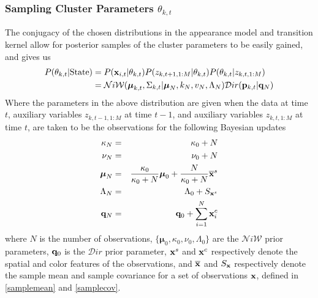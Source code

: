 \documentclass[twocolumn, final]{svjour3}
\begin{document}
\subsubsection{Sampling Cluster Parameters $\theta_{k, t}$}
The conjugacy of the chosen distributions in the appearance model and transition kernel allow for posterior samples of the cluster parameters to be easily gained, and gives us
\begin{align}
\begin{split}
P(\theta_{k,t} | \text{State}) & = P(\bold{x}_{i,t} | \theta_{k,t}) P(z_{k,t+1,1:M} | \theta_{k,t})  P(\theta_{k,t} | z_{k,t,1:M}) \\
 & = \mathcal{N}i\mathcal{W}(\boldsymbol{\mu}_{k,t}, \Sigma_{k,t} | \boldsymbol{\mu}_{N}, k_{N}, v_{N}, \Lambda_{N})  \mathcal{D}ir( \bold{p}_{k,t} | \bold{q}_{N})
\end{split}
\end{align}
Where the parameters in the above distribution are given when the data at time $t$, auxiliary variables $z_{k,t-1,1:M}$ at time $t-1$, and auxiliary variables $z_{k,t,1:M}$ at time $t$, are taken to be the observations for the following Bayesian updates
\begin{eqnarray}
\label{bayesian_update_1}
\kappa_{N} &=& \kappa_{0} + N \\
\label{bayesian_update_2}
\nu_{N} &=& \nu_{0} + N \\
\label{bayesian_update_3}
\boldsymbol{\mu}_{N} &=& \frac{\kappa_{0}}{\kappa_{0}+N} \boldsymbol{\mu}_{0}  +  \frac{N}{\kappa_{0}+N} \overline{\bold{x}}^{s}\\
\Lambda_{N} &=& \Lambda_{0} + S_{\bold{x}^{s}}\\
\label{bayesian_update_4}
\bold{q}_{N} &=& \bold{q}_{0} + \sum_{i=1}^{N} \bold{x}_{i}^{c}
\end{eqnarray}
where $N$ is the number of observations, $\{ \boldsymbol{\mu}_{0}, \kappa_{0}, \nu_{0}, \Lambda_{0} \}$ are the $\mathcal{N}i\mathcal{W}$ prior parameters, $\bold{q}_{0}$ is the $\mathcal{D}ir$ prior parameter, $\bold{x}^{s}$ and $\bold{x}^{c}$ respectively denote the spatial and color features of the observations, and $\overline{\bold{x}}$ and $S_{\bold{x}}$ respectively denote the sample mean and sample covariance for a set of observations $\bold{x}$, defined in \eqref{samplemean} and \eqref{samplecov}.
\end{document}
